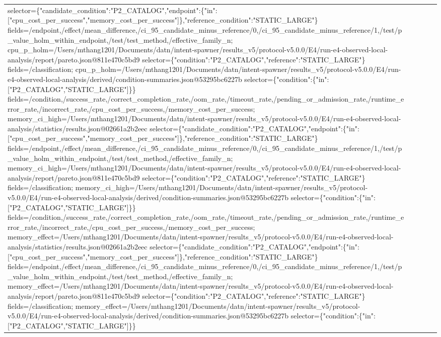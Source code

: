 \begin{tabular}{lllll}
selector=\{"candidate\_condition":"P2\_CATALOG","endpoint":\{"in":["cpu\_cost\_per\_success","memory\_cost\_per\_success"]\},"reference\_condition":"STATIC\_LARGE"\} fields=/endpoint,/effect/mean\_difference,/ci\_95\_candidate\_minus\_reference/0,/ci\_95\_candidate\_minus\_reference/1,/test/p\_value\_holm\_within\_endpoint,/test/test\_method,/effective\_family\_n; cpu\_p\_holm=/Users/mthang1201/Documents/datn/intent-spawner/results\_v5/protocol-v5.0.0/E4/run-e4-observed-local-analysis/report/pareto.json@811e470c5bd9 selector=\{"condition":"P2\_CATALOG","reference":"STATIC\_LARGE"\} fields=/classification; cpu\_p\_holm=/Users/mthang1201/Documents/datn/intent-spawner/results\_v5/protocol-v5.0.0/E4/run-e4-observed-local-analysis/derived/condition-summaries.json@53295bc6227b selector=\{"condition":\{"in":["P2\_CATALOG","STATIC\_LARGE"]\}\} fields=/condition,/success\_rate,/correct\_completion\_rate,/oom\_rate,/timeout\_rate,/pending\_or\_admission\_rate,/runtime\_error\_rate,/incorrect\_rate,/cpu\_cost\_per\_success,/memory\_cost\_per\_success; memory\_ci\_high=/Users/mthang1201/Documents/datn/intent-spawner/results\_v5/protocol-v5.0.0/E4/run-e4-observed-local-analysis/statistics/results.json@02661a2b2eec selector=\{"candidate\_condition":"P2\_CATALOG","endpoint":\{"in":["cpu\_cost\_per\_success","memory\_cost\_per\_success"]\},"reference\_condition":"STATIC\_LARGE"\} fields=/endpoint,/effect/mean\_difference,/ci\_95\_candidate\_minus\_reference/0,/ci\_95\_candidate\_minus\_reference/1,/test/p\_value\_holm\_within\_endpoint,/test/test\_method,/effective\_family\_n; memory\_ci\_high=/Users/mthang1201/Documents/datn/intent-spawner/results\_v5/protocol-v5.0.0/E4/run-e4-observed-local-analysis/report/pareto.json@811e470c5bd9 selector=\{"condition":"P2\_CATALOG","reference":"STATIC\_LARGE"\} fields=/classification; memory\_ci\_high=/Users/mthang1201/Documents/datn/intent-spawner/results\_v5/protocol-v5.0.0/E4/run-e4-observed-local-analysis/derived/condition-summaries.json@53295bc6227b selector=\{"condition":\{"in":["P2\_CATALOG","STATIC\_LARGE"]\}\} fields=/condition,/success\_rate,/correct\_completion\_rate,/oom\_rate,/timeout\_rate,/pending\_or\_admission\_rate,/runtime\_error\_rate,/incorrect\_rate,/cpu\_cost\_per\_success,/memory\_cost\_per\_success; memory\_effect=/Users/mthang1201/Documents/datn/intent-spawner/results\_v5/protocol-v5.0.0/E4/run-e4-observed-local-analysis/statistics/results.json@02661a2b2eec selector=\{"candidate\_condition":"P2\_CATALOG","endpoint":\{"in":["cpu\_cost\_per\_success","memory\_cost\_per\_success"]\},"reference\_condition":"STATIC\_LARGE"\} fields=/endpoint,/effect/mean\_difference,/ci\_95\_candidate\_minus\_reference/0,/ci\_95\_candidate\_minus\_reference/1,/test/p\_value\_holm\_within\_endpoint,/test/test\_method,/effective\_family\_n; memory\_effect=/Users/mthang1201/Documents/datn/intent-spawner/results\_v5/protocol-v5.0.0/E4/run-e4-observed-local-analysis/report/pareto.json@811e470c5bd9 selector=\{"condition":"P2\_CATALOG","reference":"STATIC\_LARGE"\} fields=/classification; memory\_effect=/Users/mthang1201/Documents/datn/intent-spawner/results\_v5/protocol-v5.0.0/E4/run-e4-observed-local-analysis/derived/condition-summaries.json@53295bc6227b selector=\{"condition":\{"in":["P2\_CATALOG","STATIC\_LARGE"]\}\} 
\end{tabular}
